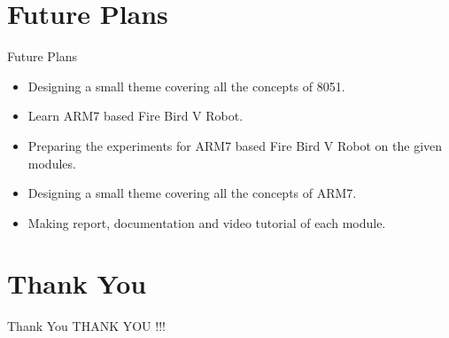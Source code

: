 \documentclass[10pt, a4paper]{beamer}
\begin{document}
\section{Future Plans}
\begin{frame}{Future Plans}
	\begin{itemize}
		\item Designing a small theme covering all the concepts of 8051.\newline
		\item Learn ARM7 based Fire Bird V Robot. \newline
		\item Preparing the experiments for ARM7 based Fire Bird V Robot on the given modules. \newline
		\item Designing a small theme covering all the concepts of ARM7.\newline
		\item Making report, documentation and video tutorial of each module. \newline
	\end{itemize}
\end{frame}

\section{Thank You}
\begin{frame}{Thank You}
	\centering THANK YOU !!!
\end{frame}
\end{document}

